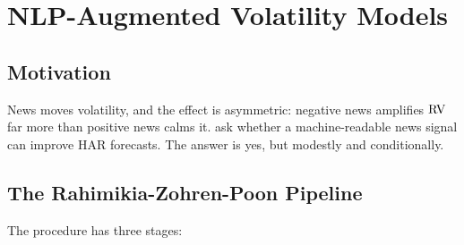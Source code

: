 \section{NLP-Augmented Volatility Models}\label{sec:hybrid:nlp}

\subsection{Motivation}

News moves volatility, and the effect is asymmetric: negative news
amplifies $\operatorname{RV}$ far more than positive news calms it.
\citet{RahimikiaZohrenPoon2021NLP} ask whether a machine-readable
news signal can improve HAR forecasts.  The answer is yes, but modestly
and conditionally.

\subsection{The Rahimikia-Zohren-Poon Pipeline}

The procedure has three stages:

